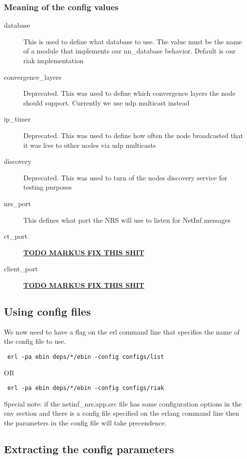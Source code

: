 \subsubsection {Meaning of the config values}
\begin{description}
\item[database]
This is used to define what database to use. The value must be the name of a module that implements our nn\_database behavior. Default is our riak implementation
\item[convergence\_layers]
Deprecated. This was used to define which convergence layers the node should support. Currently we use udp multicast instead
\item[ip\_timer]
Deprecated. This was used to define how often the node broadcasted that it was live to other nodes via udp multicasts
\item[discovery]
Deprecated. This was used to turn of the nodes discovery service for testing purposes
\item[nrs\_port]
This defines what port the NRS will use to listen for NetInf messages
\item[ct\_port]
\underline{\textbf{TODO MARKUS FIX THIS SHIT}}
\item[client\_port]
\underline{\textbf{TODO MARKUS FIX THIS SHIT}}
\end{description}

\subsection {Using config files}

We now need to have a flag on the erl command line that specifies the name of the config file to use. 

\begin {verbatim}
 erl -pa ebin deps/*/ebin -config configs/list
\end{verbatim}

OR

\begin {verbatim}
 erl -pa ebin deps/*/ebin -config configs/riak
\end{verbatim}

Special note: if the netinf\_nrs.app.src file has some configuration options in the env section and there is a config file specified on the erlang command line then the parameters in the config file  will take precendence.

\subsection {Extracting the config parameters}

